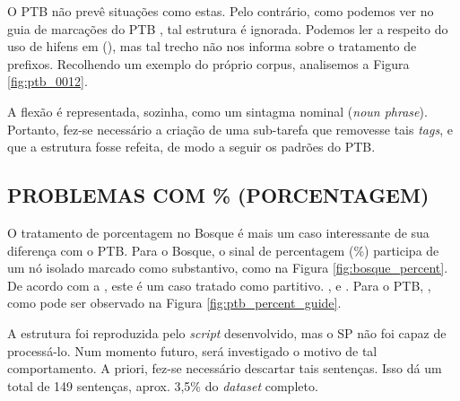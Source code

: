 \begin{center}
    
\end{center}

O PTB não prevê situações como estas. Pelo contrário, como podemos ver no guia de marcações do PTB \cite[p~315]{bracketing_ptb}, tal estrutura é ignorada. Podemos ler a respeito do uso de hifens em (\textit{}), mas tal trecho não nos informa sobre o tratamento de prefixos. Recolhendo um exemplo do próprio corpus, analisemos a Figura \ref{fig:ptb_0012}.

\begin{center}
    
\end{center}

A flexão  é representada, sozinha, como um sintagma nominal (\textit{noun phrase}). Portanto, fez-se necessário a criação de uma sub-tarefa que removesse tais \textit{tags}, e que a estrutura fosse refeita, de modo a seguir os padrões do PTB.

\subsection{PROBLEMAS COM \% (PORCENTAGEM)}
\label{subsec:percent}
O tratamento de porcentagem no Bosque é mais um caso interessante de sua diferença com o PTB.
Para o Bosque, o sinal de percentagem (\%) participa de um nó isolado marcado como substantivo, como na Figura \ref{fig:bosque_percent}. De acordo com a \cite[p~113-114]{afonso2006arvores}, este é um caso tratado como partitivo. , e . Para o PTB, , como pode ser observado na Figura \ref{fig:ptb_percent_guide}.
\begin{center}
    
\end{center}

A estrutura foi reproduzida pelo \textit{script} desenvolvido, mas o SP não foi capaz de processá-lo. Num momento futuro, será investigado o motivo de tal comportamento. A priori, fez-se necessário descartar tais sentenças. Isso dá um total de 149 sentenças, aprox. 3,5\% do \textit{dataset} completo.
\begin{center}
    
\end{center}
